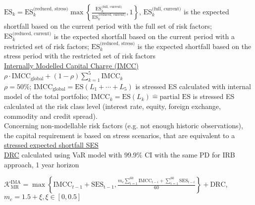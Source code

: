\documentclass[12pt,landscape, a4paper]{article}
\theoremstyle{remark}
\newcommand{\ES}{\mathrm{ES}}
\begin{document}
\begin{multicols*}{3}
$\ES_k = \ES^{\text{(reduced, stress)}}_k \max \left\{\frac{\ES^{\text{(full, current)}}_k}{\ES^{\text{(reduced, current)}}_k}, 1 \right\}$, $\ES^{\text{(full, current)}}_k$ is the expected shortfall based on the current period with the full set of risk factors; $\ES^{\text{(reduced, current)}}_k$ is the expected shortfall based on the current period with a restricted set of risk factors; $\ES^{\text{(reduced, stress)}}_k$ is the expected shortfall based on the stress period with the restricted set of risk factors\\

\underline{Internally Modelled Capital Charge (IMCC)} $\rho\cdot \mathrm{IMCC}_{\mathrm{global}} + (1-\rho) \sum^5_{k=1} \mathrm{IMCC}_k $ \\
$\rho=50\%$; $\mathrm{IMCC}_{\mathrm{global}} = \ES (L_1+\cdots + L_5)$ is stressed ES calculated with internal model of the total portfolio; $ \mathrm{IMCC}_k = \ES (L_k) \hat{=} \text{partial }\ES $ is stressed ES calculated at the risk class level (interest rate, equity, foreign exchange, commodity and credit spread).\\
Concerning non-modellable risk factors (e.g. not enough historic observations), the capital requirement is based on stress scenarios, that are equivalent to a \underline{stressed expected shortfall SES}\\
\underline{DRC} calculated using VaR model with $99.9\%$ CI with the same PD for IRB approach, 1 year horizon

$\mathcal{K}^{\mathrm{IMA}}_{\mathrm{MR}} = \max \left\{\mathrm{IMCC}_{t-1} + \mathrm{SES_{t-1}}, \frac{m_c\sum^{60}_{i=1} \mathrm{IMCC}_{t-i} + \sum^{60}_{i=1} \mathrm{SES}_{t-i}  }{60} \right\} + \mathrm{DRC} $, $m_c = 1.5 + \xi, \xi \in [0, 0.5]$





\end{multicols*}
\end{document}
